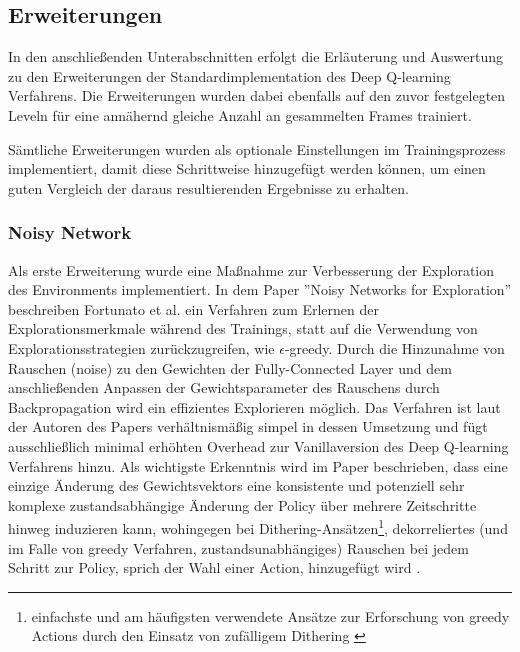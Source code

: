 \documentclass[11pt]{scrartcl}
\begin{document}
\subsection{Erweiterungen}
In den anschließenden Unterabschnitten erfolgt die Erläuterung und Auswertung zu den
Erweiterungen der Standardimplementation des Deep Q-learning Verfahrens. Die Erweiterungen
wurden dabei ebenfalls auf den zuvor festgelegten Leveln für eine annähernd gleiche Anzahl
an gesammelten Frames trainiert.

Sämtliche Erweiterungen wurden als optionale Einstellungen im Trainingsprozess implementiert,
damit diese Schrittweise hinzugefügt werden können, um einen guten Vergleich der daraus
resultierenden Ergebnisse zu erhalten.

\subsubsection{Noisy Network}
Als erste Erweiterung wurde eine Maßnahme zur Verbesserung der Exploration des Environments implementiert.
In dem Paper ''Noisy Networks for Exploration'' beschreiben Fortunato et al.\cite[~S.1 f.]{FAPMOGM2017}
ein Verfahren zum Erlernen der Explorationsmerkmale während des Trainings, statt auf die Verwendung von
Explorationsstrategien zurückzugreifen, wie $\epsilon$-greedy. Durch die Hinzunahme von Rauschen (noise)
zu den Gewichten der Fully-Connected Layer und dem anschließenden Anpassen der Gewichtsparameter des
Rauschens durch Backpropagation wird ein effizientes Explorieren möglich. Das Verfahren ist laut der
Autoren des Papers verhältnismäßig simpel in dessen Umsetzung und fügt ausschließlich minimal erhöhten
Overhead zur Vanillaversion des Deep Q-learning Verfahrens hinzu. Als wichtigste Erkenntnis wird im Paper
beschrieben, dass eine einzige Änderung des Gewichtsvektors eine konsistente und potenziell sehr komplexe
zustandsabhängige Änderung der Policy über mehrere Zeitschritte hinweg induzieren kann, wohingegen bei
Dithering-Ansätzen\footnote{einfachste und am häufigsten verwendete Ansätze zur Erforschung von greedy
Actions durch den Einsatz von zufälligem Dithering \cite[~S.2]{ORRW2019}}, dekorreliertes (und im Falle von
greedy Verfahren, zustandsunabhängiges) Rauschen bei jedem Schritt zur Policy, sprich der Wahl einer
Action, hinzugefügt wird \cite[~S.2]{FAPMOGM2017}. 
\end{document}
